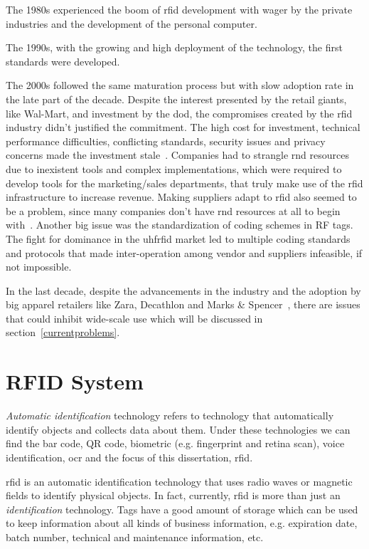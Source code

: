The 1980s experienced the boom of \ac{rfid} development with wager by the private industries and the development of the personal computer.

The 1990s, with the growing and high deployment of the technology, the first standards were developed. 

The 2000s followed the same maturation process but with slow adoption rate in the late part of the decade. 
Despite the interest presented by the retail giants, like Wal-Mart, and investment by the \ac{dod}, the compromises created by the \ac{rfid} industry didn't justified the commitment. The high cost for investment, technical performance difficulties, conflicting standards, security issues and privacy concerns made the investment stale~\cite{RFIDAdoptionStalls}. 
Companies had to strangle \ac{rnd} resources due to inexistent tools and complex implementations, which were required to develop tools for the marketing/sales departments, that truly make use of the \ac{rfid} infrastructure to increase revenue.
Making suppliers adapt to \ac{rfid} also seemed to be a problem, since many companies don't have \ac{rnd} resources at all to begin with~\cite{gaudinSuppliersGainFailed2008}.
Another big issue was the standardization of coding schemes in RF tags. The fight for dominance in the \ac{uhfrfid} market led to multiple coding standards and protocols that made inter-operation among vendor and suppliers infeasible, if not impossible.

In the last decade, despite the advancements in the industry and the adoption by big apparel retailers like Zara, Decathlon and Marks \& Spencer~\cite{RFIDRetailApparel}, there are issues that could inhibit wide-scale use which will be discussed in section~\ref{currentproblems}.

\section{RFID System}

\emph{Automatic identification} technology refers to technology that automatically identify objects and collects data about them.
Under these technologies we can find the bar code, QR code, biometric (e.g. fingerprint and retina scan), voice identification, \ac{ocr} and the focus of this dissertation, \acl{rfid}. 

\ac{rfid} is an automatic identification technology that uses radio waves or magnetic fields to identify physical objects.
In fact, currently, \ac{rfid} is more than just an \emph{identification} technology. Tags have a good amount of storage which can be used to keep information about all kinds of business information, e.g. expiration date, batch number, technical and maintenance information, etc.

